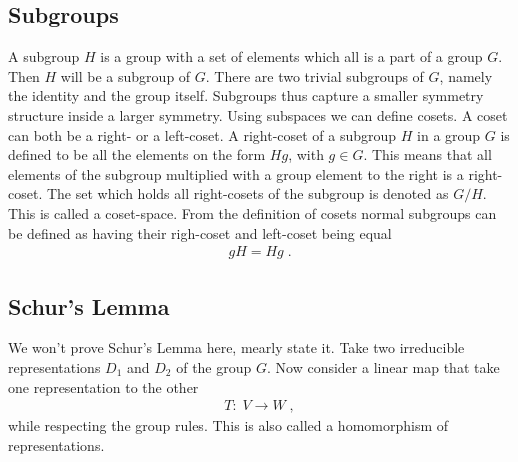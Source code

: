 
\subsection{Subgroups}
A subgroup $H$ is a group with a set of elements which all is a part of a group $G$. Then $H$ will be a subgroup of $G$. There are two trivial subgroups of $G$, namely the identity and the group itself. Subgroups thus capture a smaller symmetry structure inside a larger symmetry.
Using subspaces we can define cosets. A coset can both be a right- or a left-coset. A right-coset of a subgroup $H$ in a group $G$ is defined to be all the elements on the form $Hg$, with $g\in G$. This means that all elements of the subgroup multiplied with a group element to the right is a right-coset. The set which holds all right-cosets of the subgroup is denoted as $G/H$. This is called a coset-space. From the definition of cosets normal subgroups can be defined as having their righ-coset and left-coset being equal
\begin{align}
    gH=Hg\;.
\end{align}


\subsection{Schur's Lemma}
We won't prove Schur's Lemma here, mearly state it. Take two irreducible representations $D_1$ and $D_2$ of the group $G$. Now consider a linear map that take one representation to the other
\begin{align}
    T:\;V\to W\;,
\end{align}
while respecting the group rules. This is also called a homomorphism of representations.



